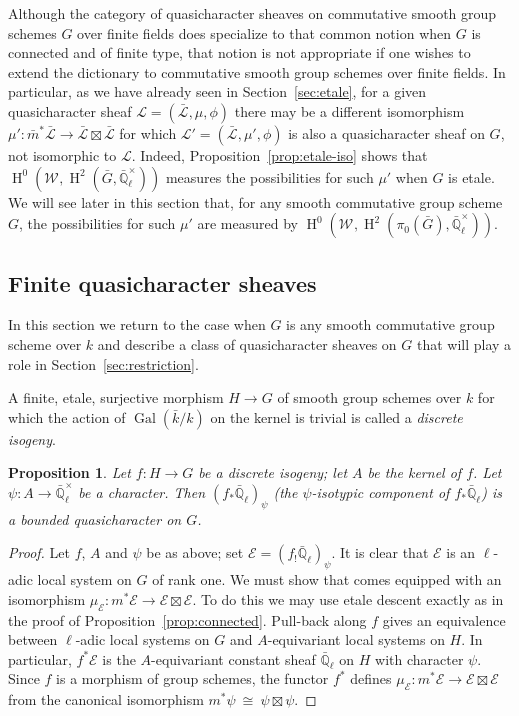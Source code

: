\documentclass{amsart}
\theoremstyle{plain}
\newtheorem{proposition}[theorem]{Proposition}
\theoremstyle{definition}
\theoremstyle{remark}
\newcommand{\EE}{\mathbb{\bar Q}_\ell}
\newcommand{\bFq}{\bar{k}}
\newcommand{\Fq}{k}
\newcommand{\EEx}{\EE^\times}
\newcommand{\Weil}[1]{\mathcal{W}_{#1}}
\DeclareMathOperator{\Gal}{Gal}
\DeclareMathOperator{\Hh}{H}
\newcommand{\iso}{{\ \cong\ }}
\newcommand{\qcs}[1]{{\mathcal{#1}}}
\newcommand{\gqcs}[1]{{\mathcal{\bar #1}}}
\newcommand{\bm}{\bar{m}}
\newcommand{\bG}{\bar{G}}
\begin{document}

Although the category of quasicharacter sheaves on commutative smooth group schemes $G$ over finite fields does specialize to that common notion when $G$ is connected and of finite type, that notion is not appropriate if one wishes to extend the dictionary to commutative smooth group schemes over finite fields. 
In particular, as we have already seen in Section~\ref{sec:etale}, for a given quasicharacter sheaf $\qcs{L} = (\gqcs{L},\mu,\phi)$ there may be a different isomorphism $\mu' : \bm^*\gqcs{L} \to \gqcs{L}\boxtimes\gqcs{L}$ for which $\qcs{L}'=(\gqcs{L},\mu',\phi)$ is also a quasicharacter sheaf on $G$, not isomorphic to $\qcs{L}$. 
Indeed, Proposition~\ref{prop:etale-iso} shows that $\Hh^0(\Weil{},\Hh^2(\bG,\EEx))$ measures the possibilities for such $\mu'$ when $G$ is etale.
We will see later in this section that, for any smooth commutative group scheme $G$, the possibilities for such $\mu'$ are measured by $\Hh^0(\Weil{},\Hh^2(\pi_0(\bG),\EEx))$.

\subsection{Finite quasicharacter sheaves}

In this section we return to the case when $G$ is any smooth commutative group scheme over $\Fq$ and describe a class of quasicharacter sheaves on $G$ that will play a role in Section~\ref{sec:restriction}.

A finite, etale, surjective morphism $H\to G$ of smooth group schemes over $\Fq$ for which the action of $\Gal(\bFq/\Fq)$ on the kernel is trivial is called a {\it discrete isogeny}.

\begin{proposition}\label{prop:finite}
Let $f: H \to G$ be a discrete isogeny; let $A$ be the kernel of $f$.
Let $\psi : A \to \EEx$ be a character.
Then $(f_* \EE)_\psi$ (the $\psi$-isotypic component of $f_*\EE$) is a bounded quasicharacter on $G$.
\end{proposition}

\begin{proof}
Let $f$, $A$ and $\psi$ be as above; set $\qcs{E} = (f_! \EE)_\psi$.
It is clear that $\qcs{E}$ is an $\ell$-adic local system on $G$ of rank one.
We must show that comes equipped with an isomorphism $\mu_\qcs{E} : m^* \qcs{E} \to \qcs{E}\boxtimes\qcs{E}$.
To do this we may use etale descent exactly as in the proof of Proposition~\ref{prop:connected}. 
Pull-back along $f$ gives an equivalence between $\ell$-adic local systems on $G$ and $A$-equivariant local systems on $H$. 
In particular, $f^*\qcs{E}$ is the $A$-equivariant constant sheaf $\EE$ on $H$ with character $\psi$.
Since $f$ is a morphism of group schemes, the functor $f^*$ defines $\mu_\qcs{E} : m^*\qcs{E} \to \qcs{E}\boxtimes\qcs{E}$ from the canonical isomorphism $m^*\psi \iso \psi \boxtimes\psi$.
\end{proof}
\end{document}
